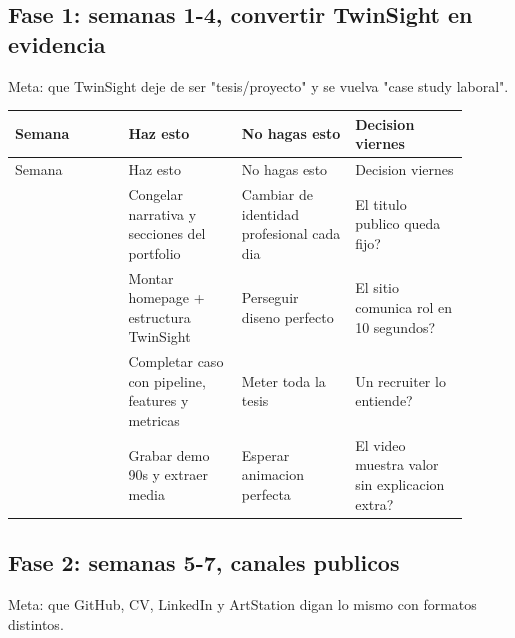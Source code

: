 \subsection{Fase 1: semanas 1-4, convertir TwinSight en evidencia}


Meta: que TwinSight deje de ser "tesis/proyecto" y se vuelva "case study laboral".


\begin{center}
\scriptsize
\begin{longtable}{>{\raggedright\arraybackslash}p{0.225\linewidth} >{\raggedright\arraybackslash}p{0.225\linewidth} >{\raggedright\arraybackslash}p{0.225\linewidth} >{\raggedright\arraybackslash}p{0.225\linewidth}}
\toprule
Semana & Haz esto & No hagas esto & Decision viernes \\
\midrule
\endfirsthead
\toprule
Semana & Haz esto & No hagas esto & Decision viernes \\
\midrule
\endhead
1 & Congelar narrativa y secciones del portfolio & Cambiar de identidad profesional cada dia & El titulo publico queda fijo? \\
2 & Montar homepage + estructura TwinSight & Perseguir diseno perfecto & El sitio comunica rol en 10 segundos? \\
3 & Completar caso con pipeline, features y metricas & Meter toda la tesis & Un recruiter lo entiende? \\
4 & Grabar demo 90s y extraer media & Esperar animacion perfecta & El video muestra valor sin explicacion extra? \\
\bottomrule
\end{longtable}
\end{center}



\subsection{Fase 2: semanas 5-7, canales publicos}


Meta: que GitHub, CV, LinkedIn y ArtStation digan lo mismo con formatos distintos.


